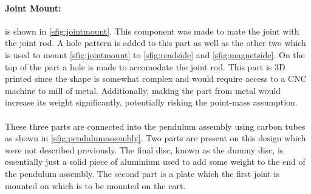 \paragraph{Joint Mount:} %
\label{par:joint_mount}
is shown in \ref{sfig:jointmount}.
This component was made to mate the joint with the joint rod.
A hole pattern is added to this part as well as the other two which is used to mount \ref{sfig:jointmount} to \ref{sfig:readside} and \ref{sfig:magnetside}.
On the top of the part a hole is made to accomodate the joint rod.
This part is 3D printed since the shape is somewhat complex and would require access to a CNC machine to mill of metal.
Additionally, making the part from metal would increase its weight significantly, potentially risking the point-mass assumption.
\\~\\
These three parts are connected into the pendulum assembly using carbon tubes as shown in \ref{sfig:pendulumassembly}.
Two parts are present on this design which were not described previously.
The final disc, known as the dummy disc, is essentially just a solid piece of aluminium used to add some weight to the end of the pendulum assembly.
The second part is a plate which the first joint is mounted on which is to be mounted on the cart.

